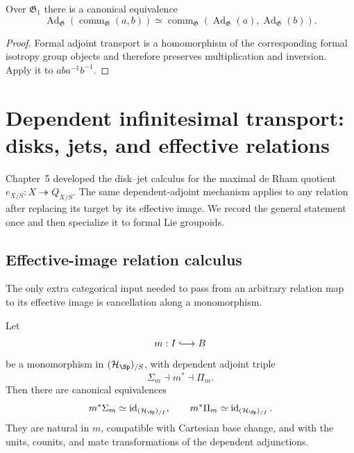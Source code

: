 \begin{proposition}
\label{prop:adjoint-commutator}
Over $\mathfrak G_1$ there is a canonical equivalence
\[
    \operatorname{Ad}_{\mathfrak G}
    \left(\operatorname{comm}_{\mathfrak G}(a,b)\right)
    \simeq
    \operatorname{comm}_{\mathfrak G}
    \left(
        \operatorname{Ad}_{\mathfrak G}(a),
        \operatorname{Ad}_{\mathfrak G}(b)
    \right).
\]
\end{proposition}

\begin{proof}
Formal adjoint transport is a homomorphism of the corresponding formal
isotropy group objects and therefore preserves multiplication and inversion.
Apply it to $aba^{-1}b^{-1}$.
\end{proof}

\section{Dependent infinitesimal transport: disks, jets, and effective relations}
\label{sec:flg-jet}

Chapter~5 developed the disk--jet calculus for the maximal de Rham quotient
$e_{X/S}:X\twoheadrightarrow Q_{X/S}$.  The same dependent-adjoint mechanism
applies to any relation after replacing its target by its effective image.  We
record the general statement once and then specialize it to formal Lie
groupoids.

\subsection{Effective-image relation calculus}
\label{sec:flg-effective-relation-calculus}

The only extra categorical input needed to pass from an arbitrary relation map
to its effective image is cancellation along a monomorphism.

\begin{lemma}
\label{lem:monomorphism-dependent-adjoint-cancellation}
Let
\[
    m:I\lhook\joinrel\longrightarrow B
\]
be a monomorphism in $(\mathcal H_{\Sp})_{/S}$, with dependent adjoint triple
\[
    \Sigma_m\dashv m^*\dashv\Pi_m.
\]
Then there are canonical equivalences
\[
    m^*\Sigma_m\simeq\operatorname{id}_{(\mathcal H_{\Sp})_{/I}},
    \qquad
    m^*\Pi_m\simeq\operatorname{id}_{(\mathcal H_{\Sp})_{/I}}.
\]
They are natural in $m$, compatible with Cartesian base change, and with the
units, counits, and mate transformations of the dependent adjunctions.
\end{lemma}

